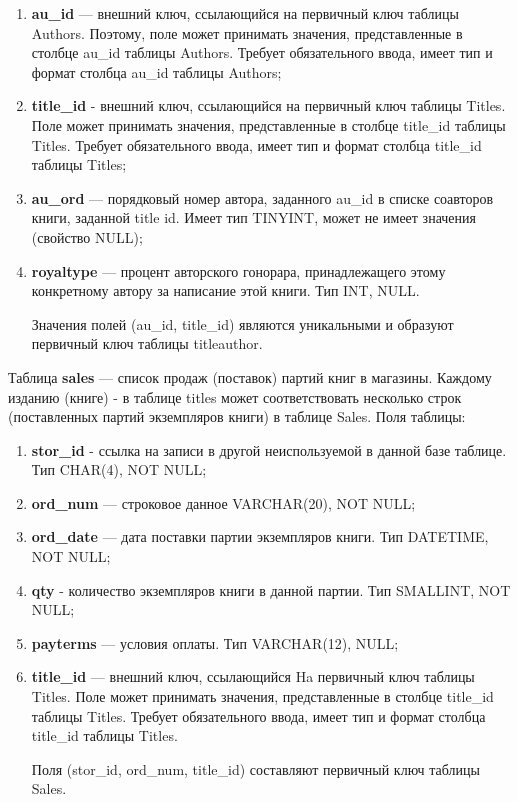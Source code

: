 \begin{enumerate}

\item \textbf{au\_id} — внешний ключ, ссылающийся на первичный ключ таблицы Authors. Поэтому, поле может принимать значения, 
 представленные в столбце au\_id таблицы Authors. Требует обязательного ввода, имеет тип и формат столбца au\_id таблицы Authors;

\item \textbf{title\_id} - внешний ключ, ссылающийся на первичный ключ таблицы Titles. Поле может принимать значения, представленные в столбце title\_id таблицы Titles. Требует обязательного ввода, имеет тип и формат столбца title\_id таблицы Titles;

\item \textbf{au\_ord} — порядковый номер автора, заданного au\_id в списке соавторов книги, заданной title id. Имеет тип TINYINT, может не имеет значения (свойство NULL);

\item \textbf{royaltype} — процент авторского гонорара, принадлежащего этому конкретному автору за написание этой книги. Тип INT, NULL. 


Значения полей (au\_id, title\_id) являются уникальными и образуют первичный ключ таблицы titleauthor.
\end{enumerate}

Таблица \textbf{sales} — список продаж (поставок) партий книг в магазины. Каждому изданию (книге) - в таблице titles может соответствовать несколько строк (поставленных партий экземпляров книги) в таблице Sales. Поля таблицы:

\begin{enumerate}
\item \textbf{stor\_id} - ссылка на записи в другой неиспользуемой в данной базе таблице. Тип CHAR(4), NOT NULL;

\item \textbf{ord\_num} — строковое данное VARCHAR(20), NOT NULL;

\item \textbf{ord\_date} — дата поставки партии экземпляров книги. Тип DATETIME, NOT NULL;

\item \textbf{qty} - количество экземпляров книги в данной партии. Тип SMALLINT, NOT NULL;

\item \textbf{payterms} — условия оплаты. Тип VARCHAR(12), NULL;

\item \textbf{title\_id} — внешний ключ, ссылающийся Ha первичный ключ таблицы Titles. Поле может принимать значения, представленные в столбце title\_id таблицы Titles. Требует обязательного ввода, имеет тип и формат столбца title\_id таблицы Titles.

Поля (stor\_id, ord\_num, title\_id) составляют первичный ключ таблицы Sales.
\end{enumerate}
\newpage
